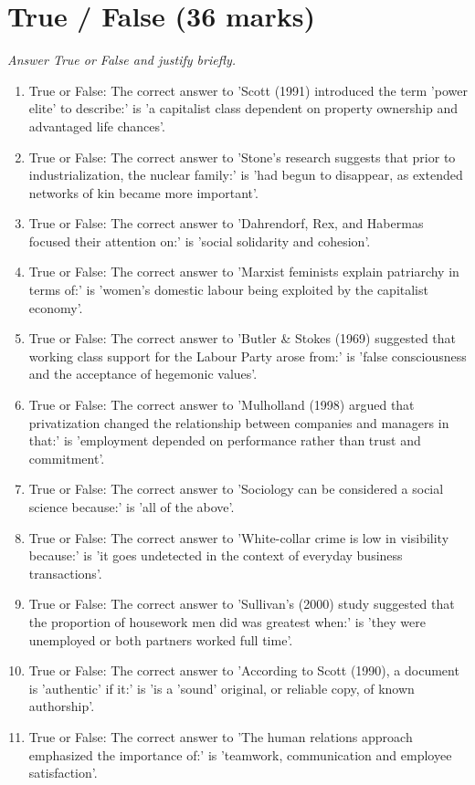\documentclass[12pt]{article}
\begin{document}
\section*{True / False (36 marks)}
\textit{Answer True or False and justify briefly.}
\begin{enumerate}[label=\arabic*.]
\item True or False: The correct answer to 'Scott (1991) introduced the term 'power elite' to describe:' is 'a capitalist class dependent on property ownership and advantaged life chances'.
\item True or False: The correct answer to 'Stone's research suggests that prior to industrialization, the nuclear family:' is 'had begun to disappear, as extended networks of kin became more important'.
\item True or False: The correct answer to 'Dahrendorf, Rex, and Habermas focused their attention on:' is 'social solidarity and cohesion'.
\item True or False: The correct answer to 'Marxist feminists explain patriarchy in terms of:' is 'women's domestic labour being exploited by the capitalist economy'.
\item True or False: The correct answer to 'Butler \& Stokes (1969) suggested that working class support for the Labour Party arose from:' is 'false consciousness and the acceptance of hegemonic values'.
\item True or False: The correct answer to 'Mulholland (1998) argued that privatization changed the relationship between companies and managers in that:' is 'employment depended on performance rather than trust and commitment'.
\item True or False: The correct answer to 'Sociology can be considered a social science because:' is 'all of the above'.
\item True or False: The correct answer to 'White-collar crime is low in visibility because:' is 'it goes undetected in the context of everyday business transactions'.
\item True or False: The correct answer to 'Sullivan's (2000) study suggested that the proportion of housework men did was greatest when:' is 'they were unemployed or both partners worked full time'.
\item True or False: The correct answer to 'According to Scott (1990), a document is 'authentic' if it:' is 'is a 'sound' original, or reliable copy, of known authorship'.
\item True or False: The correct answer to 'The human relations approach emphasized the importance of:' is 'teamwork, communication and employee satisfaction'.

\end{enumerate}
\end{document}
